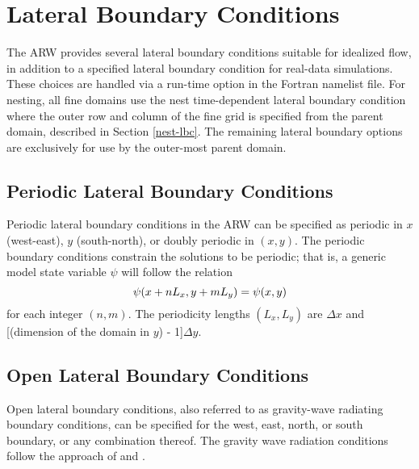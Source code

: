\chapter{Lateral Boundary Conditions}
\label{lbc_chap}

The ARW provides several lateral boundary conditions suitable 
for idealized flow, in addition to a specified lateral boundary
condition for real-data simulations.  These choices are
handled via a run-time option in the Fortran namelist file.
For nesting, all fine domains use the 
nest time-dependent lateral boundary condition where the outer row and column of the
fine grid is specified from the parent domain, described in 
Section \ref{nest-lbc}.
The remaining lateral boundary options are exclusively 
for use by the outer-most parent domain.

\section{Periodic Lateral Boundary Conditions}

Periodic lateral boundary conditions in the ARW can be specified as
periodic in $x$ (west-east), $y$ (south-north), or doubly periodic in
$(x,y)$.  The periodic boundary conditions constrain the solutions to be
periodic; that is, a generic model state variable $\psi$ will follow
the relation 
% 
\begin{equation} \psi(x+nL_x,y+mL_y) = \psi(x,y)
\notag
\end{equation} 
% 
\noindent for each integer $(n,m)$.
The periodicity lengths $(L_x,L_y)$ are \hfil{}$\Delta x$ and
[(dimension of the domain in $y$) - 1]$\Delta y$.

\section{Open Lateral Boundary Conditions}

Open lateral boundary conditions, also referred to as gravity-wave
radiating boundary conditions, can be specified for the west, east, 
north, or south boundary, or any combination thereof.  
The gravity wave radiation conditions follow the approach of 
\citet{klemp_and_lilly78} and \citet{klemp78}.

